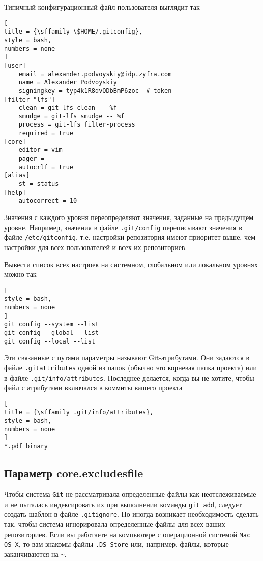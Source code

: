 \documentclass[%
	11pt,
	a4paper,
	utf8,
		]{article}
\begin{document}
Типичный конфигурационный файл пользователя выглядит так
\begin{lstlisting}[
title = {\sffamily \$HOME/.gitconfig},
style = bash,
numbers = none	
]
[user]
	email = alexander.podvoyskiy@idp.zyfra.com
	name = Alexander Podvoyskiy
	signingkey = typ4k1R8dvQDbBmP6zoc  # token
[filter "lfs"]
	clean = git-lfs clean -- %f
	smudge = git-lfs smudge -- %f
	process = git-lfs filter-process
	required = true
[core]
	editor = vim
	pager =
	autocrlf = true
[alias]
    st = status
[help]
	autocorrect = 10
\end{lstlisting}

Значения с каждого уровня переопределяют значения, заданные на предыдущем уровне. Например, значения в файле \verb|.git/config| переписывают значения в файле \verb|/etc/gitconfig|, т.е. настройки репозитория имеют приоритет выше, чем настройки для всех пользователей и всех их репозиториев.

Вывести список всех настроек на системном, глобальном или локальном уровнях можно так
\begin{lstlisting}[
style = bash,
numbers = none
]
git config --system --list
git config --global --list
git config --local --list
\end{lstlisting}

Эти связанные с путями параметры называют Git-атрибутами. Они задаются в файле \texttt{.gitattributes} одной из папок (обычно это корневая папка проекта) или в файле \texttt{.git/info/attributes}. Последнее делается, когда вы не хотите, чтобы файл с атрибутами включался в коммиты вашего проекта
\begin{lstlisting}[
title = {\sffamily .git/info/attributes},
style = bash,
numbers = none	
]
*.pdf binary
\end{lstlisting}

\subsection{Параметр core.excludesfile}

Чтобы система \texttt{Git} не рассматривала определенные файлы как неотслеживаемые и не пыталась индексировать их при выполнении команды \texttt{git add}, следует создать шаблон в файле \texttt{.gitignore}. Но иногда возникает необходимость сделать так, чтобы система игнорировала определенные файлы для всех ваших репозиториев. Если вы работаете на компьютере с операционной системой \texttt{Mac OS X}, то вам знакомы файлы \texttt{.DS\_Store} или, например, файлы, которые заканчиваются на \verb|~|.
\end{document}
